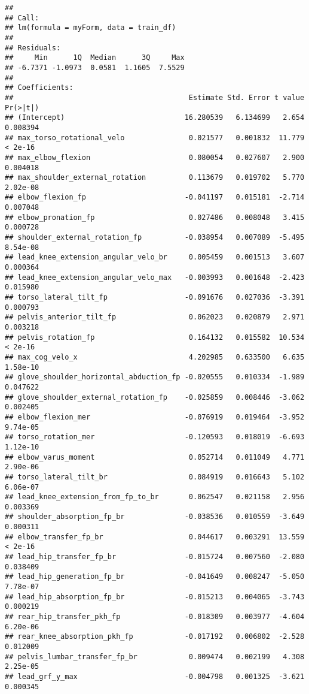 \documentclass[
]{article}
\begin{document}
\begin{verbatim}
## 
## Call:
## lm(formula = myForm, data = train_df)
## 
## Residuals:
##     Min      1Q  Median      3Q     Max 
## -6.7371 -1.0973  0.0581  1.1605  7.5529 
## 
## Coefficients:
##                                         Estimate Std. Error t value Pr(>|t|)
## (Intercept)                            16.280539   6.134699   2.654 0.008394
## max_torso_rotational_velo               0.021577   0.001832  11.779  < 2e-16
## max_elbow_flexion                       0.080054   0.027607   2.900 0.004018
## max_shoulder_external_rotation          0.113679   0.019702   5.770 2.02e-08
## elbow_flexion_fp                       -0.041197   0.015181  -2.714 0.007048
## elbow_pronation_fp                      0.027486   0.008048   3.415 0.000728
## shoulder_external_rotation_fp          -0.038954   0.007089  -5.495 8.54e-08
## lead_knee_extension_angular_velo_br     0.005459   0.001513   3.607 0.000364
## lead_knee_extension_angular_velo_max   -0.003993   0.001648  -2.423 0.015980
## torso_lateral_tilt_fp                  -0.091676   0.027036  -3.391 0.000793
## pelvis_anterior_tilt_fp                 0.062023   0.020879   2.971 0.003218
## pelvis_rotation_fp                      0.164132   0.015582  10.534  < 2e-16
## max_cog_velo_x                          4.202985   0.633500   6.635 1.58e-10
## glove_shoulder_horizontal_abduction_fp -0.020555   0.010334  -1.989 0.047622
## glove_shoulder_external_rotation_fp    -0.025859   0.008446  -3.062 0.002405
## elbow_flexion_mer                      -0.076919   0.019464  -3.952 9.74e-05
## torso_rotation_mer                     -0.120593   0.018019  -6.693 1.12e-10
## elbow_varus_moment                      0.052714   0.011049   4.771 2.90e-06
## torso_lateral_tilt_br                   0.084919   0.016643   5.102 6.06e-07
## lead_knee_extension_from_fp_to_br       0.062547   0.021158   2.956 0.003369
## shoulder_absorption_fp_br              -0.038536   0.010559  -3.649 0.000311
## elbow_transfer_fp_br                    0.044617   0.003291  13.559  < 2e-16
## lead_hip_transfer_fp_br                -0.015724   0.007560  -2.080 0.038409
## lead_hip_generation_fp_br              -0.041649   0.008247  -5.050 7.78e-07
## lead_hip_absorption_fp_br              -0.015213   0.004065  -3.743 0.000219
## rear_hip_transfer_pkh_fp               -0.018309   0.003977  -4.604 6.20e-06
## rear_knee_absorption_pkh_fp            -0.017192   0.006802  -2.528 0.012009
## pelvis_lumbar_transfer_fp_br            0.009474   0.002199   4.308 2.25e-05
## lead_grf_y_max                         -0.004798   0.001325  -3.621 0.000345

\end{verbatim}
\end{document}
